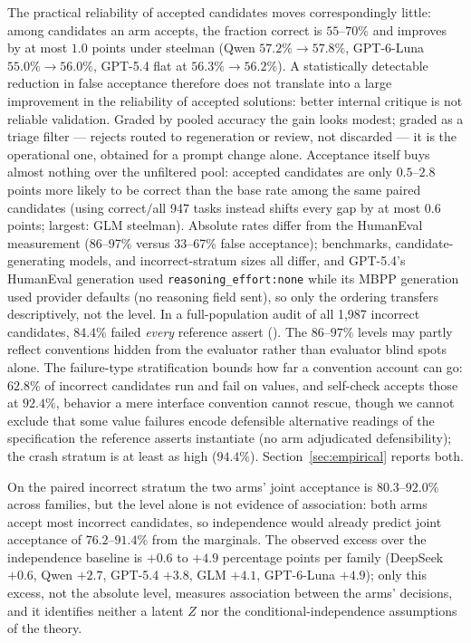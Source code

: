 \documentclass[a4paper,journal]{IAENGtran}
\begin{document}
The practical reliability of accepted candidates moves correspondingly little: among
candidates an arm accepts, the fraction correct is $55$--$70\%$ and improves by at most
$1.0$ points under steelman (Qwen $57.2\%\rightarrow57.8\%$, GPT-6-Luna
$55.0\%\rightarrow56.0\%$, GPT-5.4 flat at $56.3\%\rightarrow56.2\%$). A statistically
detectable reduction in false acceptance therefore does not translate into a large
improvement in the reliability of accepted solutions: better internal critique is not
reliable validation. Graded by pooled accuracy the gain looks modest; graded as a
triage filter — rejects routed to regeneration or review, not discarded — it is the
operational one, obtained for a prompt change alone. Acceptance itself buys almost nothing over the unfiltered pool:
accepted candidates are only $0.5$--$2.8$ points more likely to be correct than the
base rate among the same paired candidates (using correct$/$all 947 tasks instead
shifts every gap by at most $0.6$ points; largest: GLM steelman). Absolute rates differ from the HumanEval measurement (86--97\%
versus 33--67\% false acceptance); benchmarks, candidate-generating models, and
incorrect-stratum sizes all differ, and GPT-5.4's HumanEval generation used
\texttt{reasoning\_effort:none} while its MBPP generation used provider defaults
(no reasoning field sent), so only the ordering transfers descriptively, not
the level. In a full-population audit of all 1,987 incorrect candidates, 84.4\% failed
\emph{every} reference assert (). The
$86$--$97\%$ levels may partly reflect conventions hidden from the evaluator rather
than evaluator blind spots alone. The failure-type stratification bounds how far a
convention account can go: $62.8\%$ of incorrect candidates run and fail on values,
and self-check accepts those at $92.4\%$, behavior a mere interface convention cannot
rescue, though we cannot exclude that some value failures encode defensible alternative
readings of the specification the reference asserts instantiate (no arm adjudicated
defensibility); the crash stratum is at least as high ($94.4\%$).
Section~\ref{sec:empirical} reports both.

On the paired incorrect stratum the two arms' joint acceptance is $80.3$--$92.0\%$
across families, but the level alone is not evidence of association: both arms accept
most incorrect candidates, so independence would already predict joint acceptance of
$76.2$--$91.4\%$ from the marginals. The observed excess over the independence baseline
is $+0.6$ to $+4.9$ percentage points per family (DeepSeek $+0.6$, Qwen $+2.7$,
GPT-5.4 $+3.8$, GLM $+4.1$, GPT-6-Luna $+4.9$); only this excess, not the absolute
level, measures association between the arms' decisions, and it identifies neither a
latent $Z$ nor the conditional-independence assumptions of the theory.
\end{document}
